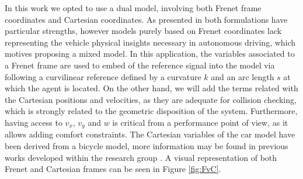 \documentclass[a4paper,fleqn]{cas-sc}
\begin{document}
In this work we opted to use a dual model, involving both Frenet frame coordinates and Cartesian coordinates. As presented in \cite{Frenet2022} both formulations have particular strengths, however models purely based on Frenet coordinates lack representing the vehicle physical insights necessary in autonomous driving, which motives proposing a mixed model. In this application, the variables associated to a Frenet frame are used to embed of the reference signal into the model via following a curvilinear reference defined by a curvature $k$ and an arc length $s$ at which the agent is located. On the other hand, we will add the terms related with the Cartesian positions and velocities, as they are adequate for collision checking, which is strongly related to the geometric disposition of the system. Furthermore, having access to $v_x$, $v_y$ and $w$ is critical from a performance point of view, as it allows adding comfort constraints. The Cartesian variables of the car model have been derived from a bicycle model, more information may be found in previous works developed within the research group \cite{alcala2020lpv}. A visual representation of both Frenet and Cartesian frames can be seen in Figure \ref{fig:FvC}. 
\end{document}
